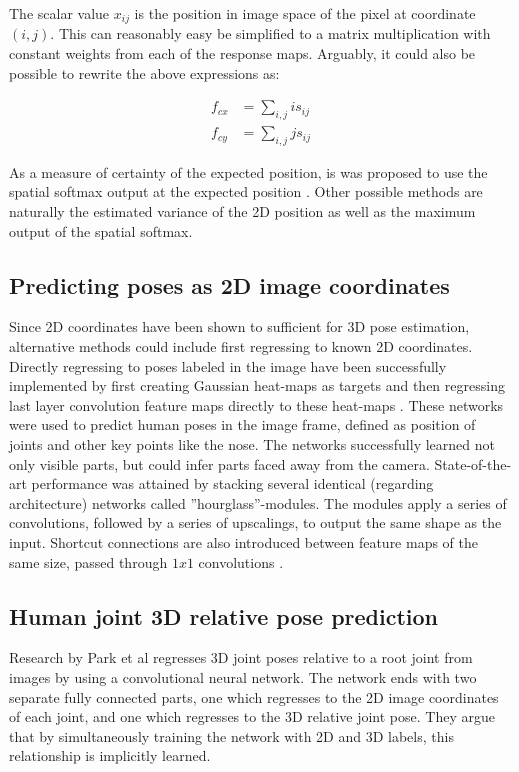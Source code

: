 The scalar value $x_{ij}$ is the position in image space of the pixel at coordinate
$(i, j)$. This can reasonably easy be simplified to a matrix multiplication with constant
weights from each of the response maps. Arguably, it could also be possible to rewrite the
above expressions as:

\begin{align}
    f_{cx} &= \sum_{i,j} i s_{ij} \\
    f_{cy} &= \sum_{i,j} j s_{ij}
\end{align}

As a measure of certainty of the expected position, is was proposed to use the
spatial softmax output at the expected position \cite{finn2016deep2}. Other
possible methods are naturally the estimated variance of the 2D position as
well as the maximum output of the spatial softmax.

\subsection{Predicting poses as 2D image coordinates}

Since 2D coordinates have been shown to sufficient for 3D pose estimation,
alternative methods could include first regressing to known 2D coordinates.
Directly regressing to poses labeled in the image have been successfully
implemented by first creating Gaussian heat-maps as targets and then regressing
last layer convolution feature maps directly to these heat-maps
\cite{newell2016stacked,tompson2014joint}. These networks were used to predict
human poses in the image frame, defined as position of joints and other key
points like the nose. The networks successfully learned not only visible parts,
but could infer parts faced away from the camera. State-of-the-art performance
was attained by stacking several identical (regarding architecture) networks
called ''hourglass''-modules. The modules apply a series of convolutions,
followed by a series of upscalings, to output the same shape as the input.
Shortcut connections are also introduced between feature maps of the same size,
passed through $1x1$ convolutions \cite{newell2016stacked}.

\subsection{Human joint 3D relative pose prediction}

Research by Park et al \cite{park20163d} regresses 3D joint poses relative to a
root joint from images by using a convolutional neural network. The network
ends with two separate fully connected parts, one which regresses to the 2D
image coordinates of each joint, and one which regresses to the 3D relative
joint pose. They argue that by simultaneously training the network with 2D and
3D labels, this relationship is implicitly learned.


